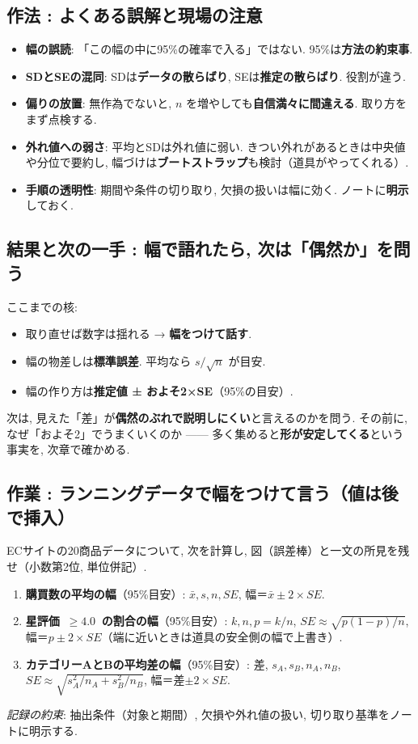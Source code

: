  \subsection{作法 : よくある誤解と現場の注意}
    \begin{itemize}
      \item \textbf{幅の誤読}: 「この幅の中に95\%の確率で入る」ではない. 95\%は\textbf{方法の約束事}.
      \item \textbf{SDとSEの混同}: SDは\textbf{データの散らばり}, SEは\textbf{推定の散らばり}. 役割が違う.
      \item \textbf{偏りの放置}: 無作為でないと, $n$ を増やしても\textbf{自信満々に間違える}. 取り方をまず点検する.
      \item \textbf{外れ値への弱さ}: 平均とSDは外れ値に弱い. きつい外れがあるときは中央値や分位で要約し, 幅づけは\textbf{ブートストラップ}も検討（道具がやってくれる）.
      \item \textbf{手順の透明性}: 期間や条件の切り取り, 欠損の扱いは幅に効く. ノートに\textbf{明示}しておく.
    \end{itemize}

  \subsection{結果と次の一手 : 幅で語れたら, 次は「偶然か」を問う}
    ここまでの核:
    \begin{itemize}
      \item 取り直せば数字は揺れる → \textbf{幅をつけて話す}.
      \item 幅の物差しは\textbf{標準誤差}. 平均なら $s/\sqrt{n}$ が目安.
      \item 幅の作り方は\textbf{推定値 ± およそ2×SE}（95\%の目安）.
    \end{itemize}
    次は, 見えた「差」が\textbf{偶然のぶれで説明しにくい}と言えるのかを問う.  
    その前に, なぜ「およそ2」でうまくいくのか —— 多く集めると\textbf{形が安定してくる}という事実を, 次章で確かめる.

  \subsection*{作業 : ランニングデータで幅をつけて言う（値は後で挿入）}
    ECサイトの20商品データについて, 次を計算し, 図（誤差棒）と一文の所見を残せ（小数第2位, 単位併記）.
    \begin{enumerate}
      \item \textbf{購買数の平均の幅}（95\%目安）: $\bar{x}, s, n, SE$, 幅＝$\bar{x}\pm 2\times SE$.
      \item \textbf{星評価 \,$\ge 4.0$\, の割合の幅}（95\%目安）: $k, n, p=k/n$, $SE\approx \sqrt{p(1-p)/n}$, 幅＝$p\pm 2\times SE$（端に近いときは道具の安全側の幅で上書き）.
      \item \textbf{カテゴリーAとBの平均差の幅}（95\%目安）: 差, $s_A, s_B, n_A, n_B$, $SE\approx \sqrt{s_A^2/n_A+s_B^2/n_B}$, 幅＝差$\pm 2\times SE$.
    \end{enumerate}
    \textit{記録の約束}: 抽出条件（対象と期間）, 欠損や外れ値の扱い, 切り取り基準をノートに明示する.






